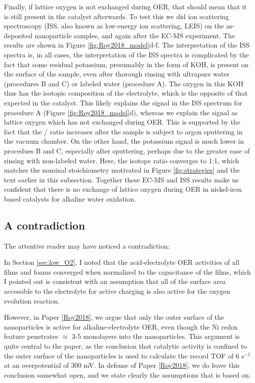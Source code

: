 Finally, if lattice oxygen is not exchanged during OER, that should mean that it is still present in the catalyst afterwards. To test this we did ion scattering spectroscopy (ISS, also known as low-energy ion scattering, LEIS) on the as-deposited nanoparticle samples, and again after the EC-MS experiment. The results are shown in Figure \ref{fig:Roy2018_model}d-f. The interpretation of the ISS spectra is, in all cases, the interpretation of the ISS spectra is complicated by the fact that some residual potassium, presumably in the form of KOH, is present on the surface of the sample, even after thorough rinsing with ultrapure water (procedures B and C) or labeled water (procedure A). The oxygen in this KOH thus has the isotopic composition of the electrolyte, which is the opposite of that expected in the catalyst. This likely explains the  signal in the ISS spectrum for procedure A (Figure \ref{fig:Roy2018_model}d), whereas we explain the  signal as lattice oxygen which has not exchanged during OER. This is supported by the fact that the / ratio increases after the sample is subject to argon sputtering in the vacuum chamber. On the other hand, the potassium signal is much lower in procedues B and C, especially after sputtering, perhaps due to the greater ease of rinsing with non-labeled water. Here, the isotope ratio converges to 1:1, which matches the nominal stoichiometry motivated in Figure \ref{fig:strategies} and the text earlier in this subsection. Together these EC-MS and ISS results make us confident that there is no exchange of lattice oxygen during OER in nickel-iron based catalysts for alkaline water oxidation.

\subsection{A contradiction}

The attentive reader may have noticed a contradiction:

In Section \ref{sec:low_O2}, I noted that the acid-electrolyte OER activities of all  films and  foams converged when normalized to the capacitance of the films, which I pointed out is consistent with an assumption that all of the surface area accessible to the electrolyte for active charging is also active for the oxygen evolution reaction. 

However, in Paper \ref{Roy2018}, we argue that only the outer surface of the nanoparticles is active for alkaline-electrolyte OER, even though the Ni redox feature penetrates $\approx$ 3-5 monolayers into the nanoparticles. This argument is quite central to the paper, as the conclusion that catalytic activity is confined to the outer surface of the nanoparticles is used to calculate the record TOF of 6 s$^{-1}$ at an overpotential of 300 mV. In defense of Paper \ref{Roy2018}, we do leave this conclusion somewhat open, and we state clearly the assumptions that is based on. 

